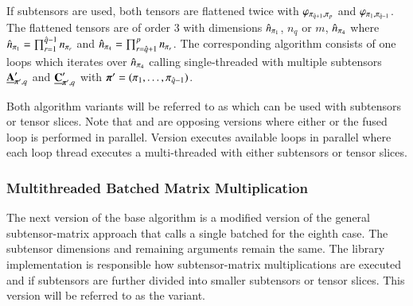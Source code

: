 If subtensors are used, both tensors are flattened twice with $\varphi_{\pi_{\hat{q}+1},\pi_p}$ and $\varphi_{\pi_{1},\pi_{\hat{q}-1}}$. 
The flattened tensors are of order $3$ with dimensions $\hat{n}_{\pi_1}$, $n_{q}$ or $m$, $\hat{n}_{\pi_4}$ where $\hat{n}_{\pi_1} = \prod_{r=1}^{\hat{q}-1} n_{\pi_r}$ and $\hat{n}_{\pi_4} = \prod_{r=\hat{q}+1}^{p} n_{\pi_r}$.
The corresponding algorithm consists of one loops which iterates over $\hat{n}_{\pi_4}$ calling single-threaded  with multiple subtensors $\underline{\mathbf{A}}_{\boldsymbol{\pi}',q}'$ and $\underline{\mathbf{C}}_{\boldsymbol{\pi}',q}'$ with $\boldsymbol{\pi}' = (\pi_1,\dots,\pi_{\hat{q}-1})$.

Both algorithm variants will be referred to as \allowbreak\ttt{,}\allowbreak{} which can be used with subtensors or tensor slices.
Note that \allowbreak\ttt{,}\allowbreak{} and \allowbreak\ttt{,}\allowbreak{} are opposing versions where either  or the fused loop is performed in parallel.
Version \allowbreak\ttt{,}\allowbreak{} executes available loops in parallel where each loop thread executes a multi-threaded  with either subtensors or tensor slices.

\subsubsection{Multithreaded Batched Matrix Multiplication}
The next version of the base algorithm is a modified version of the general subtensor-matrix approach that calls a single batched  for the eighth case.
The subtensor dimensions and remaining  arguments remain the same.
The library implementation is responsible how subtensor-matrix multiplications are executed and if subtensors are further divided into smaller subtensors or tensor slices.
This version will be referred to as the  variant.
